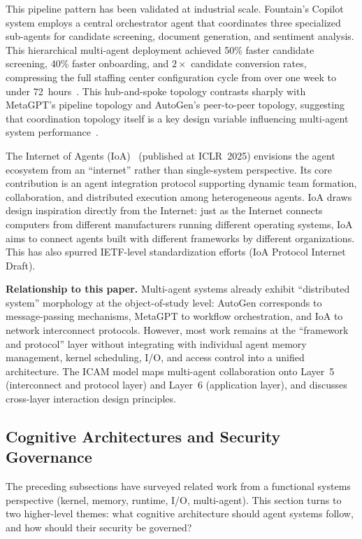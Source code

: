 \documentclass[11pt,a4paper]{article}
\begin{document}
This pipeline pattern has been validated at industrial scale.
Fountain's Copilot system employs a central orchestrator agent that coordinates three specialized sub-agents for candidate screening, document generation, and sentiment analysis.
This hierarchical multi-agent deployment achieved 50\% faster candidate screening, 40\% faster onboarding, and $2\times$ candidate conversion rates, compressing the full staffing center configuration cycle from over one week to under 72~hours~\cite{anthropic2026agenticreport}.
This hub-and-spoke topology contrasts sharply with MetaGPT's pipeline topology and AutoGen's peer-to-peer topology, suggesting that coordination topology itself is a key design variable influencing multi-agent system performance~\cite{wu2023autogen,metagpt2023}.

The Internet of Agents (IoA)~\cite{ioa2024} (published at ICLR~2025) envisions the agent ecosystem from an ``internet'' rather than single-system perspective.
Its core contribution is an agent integration protocol supporting dynamic team formation, collaboration, and distributed execution among heterogeneous agents.
IoA draws design inspiration directly from the Internet: just as the Internet connects computers from different manufacturers running different operating systems, IoA aims to connect agents built with different frameworks by different organizations.
This has also spurred IETF-level standardization efforts (IoA Protocol Internet Draft).

\textbf{Relationship to this paper.}
Multi-agent systems already exhibit ``distributed system'' morphology at the object-of-study level: AutoGen corresponds to message-passing mechanisms, MetaGPT to workflow orchestration, and IoA to network interconnect protocols.
However, most work remains at the ``framework and protocol'' layer without integrating with individual agent memory management, kernel scheduling, I/O, and access control into a unified architecture.
The ICAM model maps multi-agent collaboration onto Layer~5 (interconnect and protocol layer) and Layer~6 (application layer), and discusses cross-layer interaction design principles.

\subsection{Cognitive Architectures and Security Governance}
\label{sec:related-cognition-security}

The preceding subsections have surveyed related work from a functional systems perspective (kernel, memory, runtime, I/O, multi-agent).
This section turns to two higher-level themes: what cognitive architecture should agent systems follow, and how should their security be governed?
\end{document}
